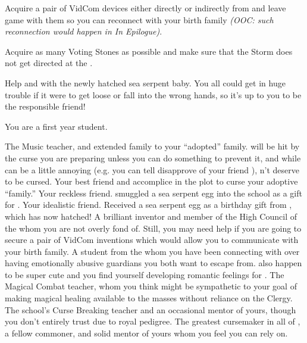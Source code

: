 \documentclass[char]{GL2020}
\begin{document}
\begin{itemz}
    \item Acquire a pair of VidCom devices either directly or indirectly from \cTechStar{} and leave game with them so you can reconnect with your birth family \emph{(OOC: such reconnection would happen in In Epilogue)}.
    \item Acquire as many Voting Stones as possible and make sure that the Storm does not get directed at the \pFarm{}.
    \item Help \cPirateChild{} and \cDisney{} with the newly hatched sea serpent baby. You all could get in huge trouble if it were to get loose or fall into the wrong hands, so it’s up to you to be the responsible friend!

\end{itemz}

\begin{itemz}[Notes]
    \item You are a first year student.
\end{itemz}

\begin{contacts}
    \contact{\cMusic{}} The Music teacher, and extended family to your ``adopted'' family. \cMusic{\They} will be hit by the curse you are preparing unless you can do something to prevent it, and while \cMusic{} can be a little annoying (e.g. you can tell \cMusic{\they} disapprove\cMusic{\verbs} of your friend \cLibAssist{}), \cMusic{\Theydo}n't deserve to be cursed.
    \contact{\cLibAssist{}} Your best friend and accomplice in the plot to curse your adoptive “family.”
    \contact{\cPirateChild{}} Your reckless \pShippie{} friend. \cPirateChild{\They} smuggled a sea serpent egg into the school as a gift for \cDisney{}.
    \contact{\cDisney{}} Your idealistic \cDisney{\cleric} friend. Received a sea serpent egg as a birthday gift from \cPirateChild{}, which has now hatched!
    \contact{\cTechStar{}} A brilliant inventor and member of the High Council of the \pTech{} whom you are not overly fond of. Still, you may need \cTechStar{\their} help if you are going to secure a pair of \cTechStar{\their} VidCom inventions which would allow you to communicate with your birth family. 
    \contact{\cScholarship{}} A student from the \pTech{} whom you have been connecting with over having emotionally abusive guardians you both want to escape from. \cScholarship{\They} also happen\cScholarship{\verbs} to be super cute and you find yourself developing romantic feelings for \cScholarship{\them}.
    \contact{\cInterpol{}} The Magical Combat teacher, whom you think might be sympathetic to your goal of making magical healing available to the masses without reliance on the Clergy.
    \contact{\cPrince{}} The school's Curse Breaking teacher and an occasional mentor of yours, though you don't entirely trust \cPrince{\them} due to \cPrince{\their} royal pedigree. 
    \contact{\cCurse{}} The greatest cursemaker in all of \pEarth{}, a fellow commoner, and solid mentor of yours whom you feel you can rely on.
\end{contacts}
\end{document}
